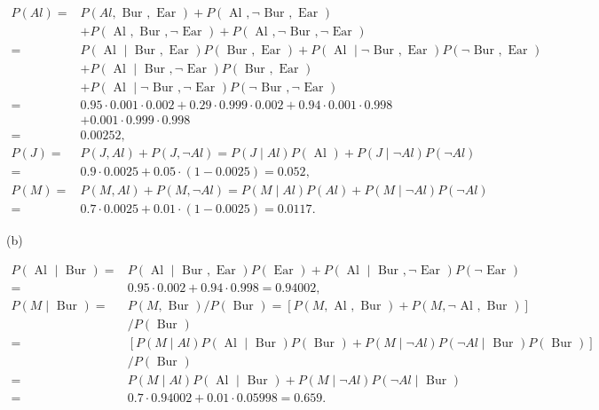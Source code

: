 \documentclass[10pt]{book}
\begin{document}
$$
\begin{aligned}
P(A l)= & P(A l, \text { Bur }, \text { Ear })+P(\text { Al }, \neg \text { Bur }, \text { Ear }) \\
& +P(\text { Al }, \text { Bur }, \neg \text { Ear })+P(\text { Al }, \neg \text { Bur }, \neg \text { Ear }) \\
= & P(\text { Al } \mid \text { Bur }, \text { Ear }) P(\text { Bur }, \text { Ear })+P(\text { Al } \mid \neg \text { Bur }, \text { Ear }) P(\neg \text { Bur }, \text { Ear }) \\
& +P(\text { Al } \mid \text { Bur }, \neg \text { Ear }) P(\text { Bur }, \text { Ear }) \\
& +P(\text { Al } \mid \neg \text { Bur }, \neg \text { Ear }) P(\neg \text { Bur }, \neg \text { Ear }) \\
= & 0.95 \cdot 0.001 \cdot 0.002+0.29 \cdot 0.999 \cdot 0.002+0.94 \cdot 0.001 \cdot 0.998 \\
& +0.001 \cdot 0.999 \cdot 0.998 \\
= & 0.00252, \\
P(J)= & P(J, A l)+P(J, \neg A l)=P(J \mid A l) P(\text { Al })+P(J \mid \neg A l) P(\neg A l) \\
= & 0.9 \cdot 0.0025+0.05 \cdot(1-0.0025)=0.052, \\
P(M)= & P(M, A l)+P(M, \neg A l)=P(M \mid A l) P(A l)+P(M \mid \neg A l) P(\neg A l) \\
= & 0.7 \cdot 0.0025+0.01 \cdot(1-0.0025)=0.0117 .
\end{aligned}
$$

(b)

$$
\begin{aligned}
P(\text { Al } \mid \text { Bur })= & P(\text { Al } \mid \text { Bur }, \text { Ear }) P(\text { Ear })+P(\text { Al } \mid \text { Bur }, \neg \text { Ear }) P(\neg \text { Ear }) \\
= & 0.95 \cdot 0.002+0.94 \cdot 0.998=0.94002, \\
P(M \mid \text { Bur })= & P(M, \text { Bur }) / P(\text { Bur })=[P(M, \text { Al }, \text { Bur })+P(M, \neg \text { Al }, \text { Bur })] \\
& / P(\text { Bur }) \\
= & {[P(M \mid A l) P(\text { Al } \mid \text { Bur }) P(\text { Bur })+P(M \mid \neg A l) P(\neg A l \mid \text { Bur }) P(\text { Bur })] } \\
& / P(\text { Bur }) \\
= & P(M \mid A l) P(\text { Al } \mid \text { Bur })+P(M \mid \neg A l) P(\neg A l \mid \text { Bur }) \\
= & 0.7 \cdot 0.94002+0.01 \cdot 0.05998=0.659 .
\end{aligned}
$$
\end{document}
